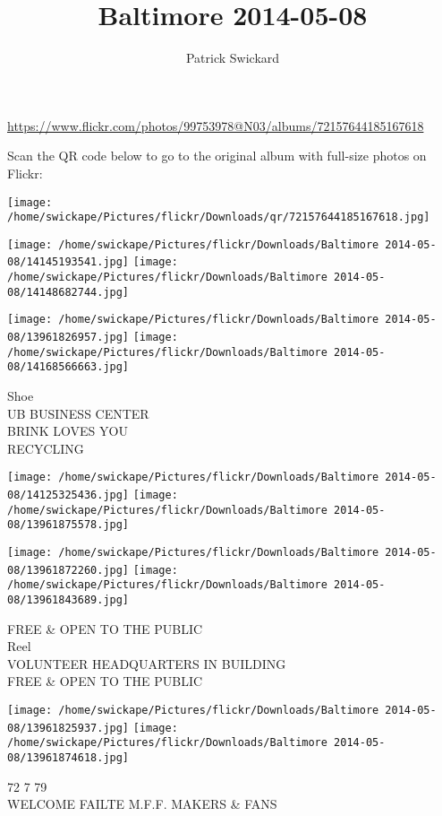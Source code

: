 \documentclass[10pt,letterpaper]{article}
\title{Baltimore 2014-05-08}
\author{Patrick Swickard}
\date{}
\begin{document}
\maketitle

\url{https://www.flickr.com/photos/99753978@N03/albums/72157644185167618}

Scan the QR code below to go to the original album with full-size photos on Flickr:

\texttt{[image: /home/swickape/Pictures/flickr/Downloads/qr/72157644185167618.jpg]}
\pagebreak

\texttt{[image: /home/swickape/Pictures/flickr/Downloads/Baltimore 2014-05-08/14145193541.jpg]}
\texttt{[image: /home/swickape/Pictures/flickr/Downloads/Baltimore 2014-05-08/14148682744.jpg]}

\texttt{[image: /home/swickape/Pictures/flickr/Downloads/Baltimore 2014-05-08/13961826957.jpg]}
\texttt{[image: /home/swickape/Pictures/flickr/Downloads/Baltimore 2014-05-08/14168566663.jpg]}

Shoe\\
UB BUSINESS CENTER\\
BRINK LOVES YOU\\
RECYCLING
\pagebreak

\texttt{[image: /home/swickape/Pictures/flickr/Downloads/Baltimore 2014-05-08/14125325436.jpg]}
\texttt{[image: /home/swickape/Pictures/flickr/Downloads/Baltimore 2014-05-08/13961875578.jpg]}

\texttt{[image: /home/swickape/Pictures/flickr/Downloads/Baltimore 2014-05-08/13961872260.jpg]}
\texttt{[image: /home/swickape/Pictures/flickr/Downloads/Baltimore 2014-05-08/13961843689.jpg]}

FREE \& OPEN TO THE PUBLIC\\
Reel\\
VOLUNTEER HEADQUARTERS IN BUILDING\\
FREE \& OPEN TO THE PUBLIC
\pagebreak

\texttt{[image: /home/swickape/Pictures/flickr/Downloads/Baltimore 2014-05-08/13961825937.jpg]}
\texttt{[image: /home/swickape/Pictures/flickr/Downloads/Baltimore 2014-05-08/13961874618.jpg]}

72 7 79\\
WELCOME FAILTE M.F.F. MAKERS \& FANS
\pagebreak
\end{document}
